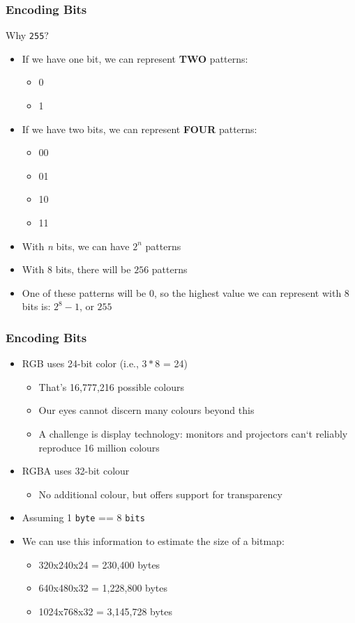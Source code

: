 
\begin{frame}
	\frametitle{Encoding Bits}
	
	Why \texttt{255}?
	
	\begin{itemize}
		\item If we have one bit, we can represent \textbf{TWO} patterns:
		\begin{itemize}
			\item 0
			\item 1
		\end{itemize}
		
		\item If we have two bits, we can represent \textbf{FOUR} patterns:
		\begin{itemize}
			\item 00
			\item 01
			\item 10
			\item 11
		\end{itemize}
		\item With \textit{n} bits, we can have $2^n$ patterns
		\item With $8$ bits, there will be $256$ patterns
		\item One of these patterns will be $0$, so the highest value we can represent with $8$ bits is: $2^8 - 1$, or $255$
	\end{itemize}
\end{frame}

\begin{frame}
	\frametitle{Encoding Bits}
	\begin{itemize}
		\item RGB uses 24-bit color (i.e., $3 * 8$ = 24)
		\begin{itemize}
			\item That's 16,777,216 possible colours
			\item Our eyes cannot discern many colours beyond this
			\item A challenge is display technology: monitors and projectors can`t reliably reproduce 16 million colours
		\end{itemize}
		\item RGBA uses 32-bit colour
		\begin{itemize}
			\item No additional colour, but offers support for transparency
		\end{itemize}
		\item Assuming 1 \texttt{byte} == 8 \texttt{bits}
		\item We can use this information to estimate the size of a bitmap:
		\begin{itemize}
			\item 320x240x24 = 230,400 bytes
			\item 640x480x32 = 1,228,800 bytes
			\item 1024x768x32 = 3,145,728 bytes
		\end{itemize}
	\end{itemize}
\end{frame}